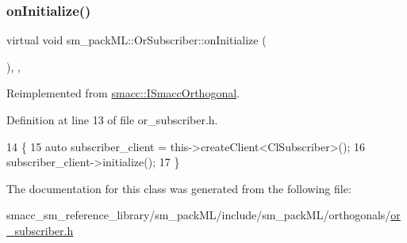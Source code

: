 \subsubsection{\texorpdfstring{on\+Initialize()}{onInitialize()}}
{\footnotesize\ttfamily virtual void sm\+\_\+pack\+M\+L\+::\+Or\+Subscriber\+::on\+Initialize (\begin{DoxyParamCaption}{ }\end{DoxyParamCaption})\hspace{0.3cm}{\ttfamily [inline]}, {\ttfamily [override]}, {\ttfamily [virtual]}}



Reimplemented from \hyperlink{classsmacc_1_1ISmaccOrthogonal_a6bb31c620cb64dd7b8417f8705c79c7a}{smacc\+::\+I\+Smacc\+Orthogonal}.



Definition at line 13 of file or\+\_\+subscriber.\+h.


\begin{DoxyCode}
14     \{
15         \textcolor{keyword}{auto} subscriber\_client = this->createClient<ClSubscriber>();
16         subscriber\_client->initialize();
17     \}
\end{DoxyCode}


The documentation for this class was generated from the following file\+:\begin{DoxyCompactItemize}
\item 
smacc\+\_\+sm\+\_\+reference\+\_\+library/sm\+\_\+pack\+M\+L/include/sm\+\_\+pack\+M\+L/orthogonals/\hyperlink{sm__packML_2include_2sm__packML_2orthogonals_2or__subscriber_8h}{or\+\_\+subscriber.\+h}\end{DoxyCompactItemize}
